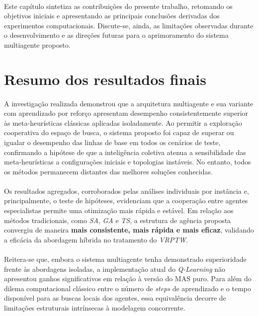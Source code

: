 \paragraph{}
Este capítulo sintetiza as contribuições do presente trabalho, retomando os objetivos iniciais e apresentando as principais conclusões derivadas dos experimentos computacionais. Discute-se, ainda, as limitações observadas durante o desenvolvimento e as direções futuras para o aprimoramento do sistema multiagente proposto.

\section{Resumo dos resultados finais}

\paragraph{} A investigação realizada demonstrou que a arquitetura multiagente e sua variante com aprendizado por reforço apresentam desempenho consistentemente superior às meta-heurísticas clássicas aplicadas isoladamente. Ao permitir a exploração cooperativa do espaço de busca, o sistema proposto foi capaz de superar ou igualar o desempenho das linhas de base em todos os cenários de teste, confirmando a hipótese de que a inteligência coletiva atenua a sensibilidade das meta-heurísticas a configurações iniciais e topologias instáveis. No entanto, todos os métodos permanecem distantes das melhores soluções conhecidas.

\paragraph{} Os resultados agregados, corroborados pelas análises individuais por instância e, principalmente, o teste de hipóteses, evidenciam que a cooperação entre agentes especialistas permite uma otimização mais rápida e estável. Em relação aos métodos tradicionais, como \textit{SA}, \textit{GA} e \textit{TS}, a estrutura de agência proposta convergiu de maneira \textbf{mais consistente, mais rápida e mais eficaz}, validando a eficácia da abordagem híbrida no tratamento do \textit{VRPTW}.

\paragraph{} Reitera-se que, embora o sistema multiagente tenha demonstrado superioridade frente às abordagens isoladas, a implementação atual do \textit{Q-Learning} não apresentou ganhos significativos em relação à versão do MAS puro. Para além do dilema computacional clássico entre o número de \textit{steps} de aprendizado e o tempo disponível para as buscas locais dos agentes, essa equivalência decorre de limitações estruturais intrínsecas à modelagem concorrente.

